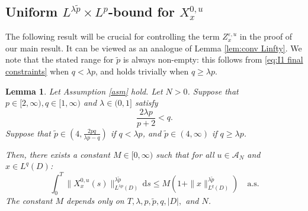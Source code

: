 \documentclass[10pt,a4paper]{amsart}
\newtheorem{lemma}[theorem]{Lemma}
\numberwithin{equation}{section}
\newcommand{\eps}{\varepsilon}
\newcommand{\A}{{\mathcal A}}
\newcommand{\dd}{\,\mathrm{d}}
\begin{document}
 
\subsection{Uniform $L^{\lambda\tilde p}\times L^p$-bound for $X_x^{0,u}$}\label{sub:I2} 

The following result will be crucial for controlling the term $Z^{\eps,u}_x$ in the proof of our main result. It can be viewed as an analogue of Lemma \ref{lem:conv Linfty}. 
We note that the stated range for $\tilde p$ is always non-empty: this follows from \eqref{eq:I1 final constraints} when $q<\lambda p$, and holds trivially when $q\geq \lambda p$.


\begin{lemma}\label{lem:I2}
Let Assumption \ref{asm} hold. 
 Let $N>0$. Suppose that $p\in[2,\infty), q\in[1,\infty)$ and $\lambda\in(0,1]$ satisfy 
\begin{equation}\label{eq:I1 final constraints}
\frac{2\lambda p}{p+2}< q.
\end{equation} 
Suppose that $\tilde{p}\in(4,\frac{2pq}{\lambda p-q})$ if $q< \lambda p$, and $\tilde{p}\in(4,\infty)$ if  $q\geq \lambda p$. 

Then, there exists a constant $M\in[0,\infty)$ such that for all $u\in\A_N$ and $x\in L^q(D)$: 
\begin{equation*} 
\int_0^T\|X_x^{0,u}(s)\|_{L^{\lambda p}(D)}^{\lambda\tilde p}\dd s \leq M (1+\|x\|_{L^q(D)}^{\lambda\tilde p})\quad \text{a.s.}
\end{equation*}
The constant $M$ depends only on $T,\lambda,p,\tilde p,q,|D|,$ and $N$.
\end{lemma} 
\end{document}
